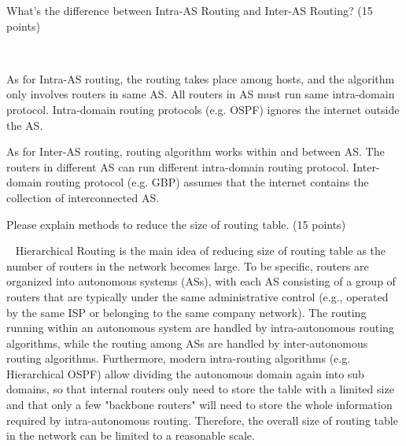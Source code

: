 \begin{exercise}[]{What’s the difference between Intra-AS Routing and Inter-AS Routing? (15
  points)}
  \begin{solution}
  \par{~}

  As for Intra-AS routing, the routing takes place among hosts, and the algorithm only involves routers in same AS. All routers in AS must run same intra-domain protocol. Intra-domain routing protocols (e.g. OSPF) ignores the internet outside the AS.
  
  As for Inter-AS routing, routing algorithm works within and between AS. The routers in different AS can run different intra-domain routing protocol. Inter-domain routing protocol (e.g. GBP) assumes that the internet contains the collection of interconnected AS.


  \end{solution}
  \label{ex5}
\end{exercise}


\begin{exercise}[]{Please explain methods to reduce the size of routing table. (15 points)}
  \begin{solution}
  \par{~}
  Hierarchical Routing is the main idea of reducing size of routing table as the number of routers in the network becomes large. To be specific, routers are organized into autonomous systems (ASs), with each AS consisting of a group of routers that are typically under the same administrative control (e.g., operated by the same ISP or belonging to the same company network). The routing running within an autonomous system are handled by intra-autonomous routing algorithms, while the routing among ASs are handled by inter-autonomous routing algorithms. Furthermore, modern intra-routing algorithms (e.g. Hierarchical OSPF) allow dividing the autonomous domain again into sub domains, so that internal routers only need to store the table with a limited size and that only a few "backbone routers" will need to store the whole information required by intra-autonomous routing. Therefore, the overall size of routing table in the network can be limited to a reasonable scale.
  \end{solution}
  \label{ex6}
\end{exercise}

